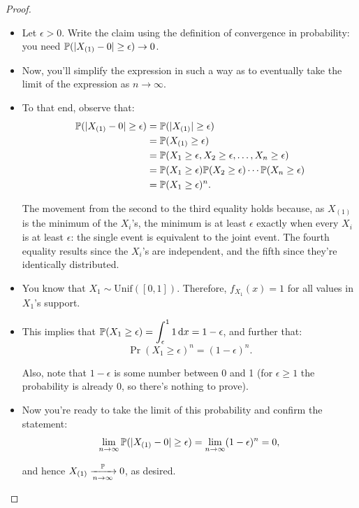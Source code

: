 \begin{proof}
\leavevmode %
\begin{itemize}

\item Let $\epsilon > 0$.
Write the claim using the definition of convergence in probability: you need $\mathbb{P}(\lvert X_{(1)} - 0\rvert \geq \epsilon) \to 0$.

\item Now, you'll simplify the expression in such a way as to eventually take the limit of the expression as $n \to \infty$.

\item To that end, observe that:
\begin{align*}
\mathbb{P}(\lvert X_{(1)} - 0\rvert \geq \epsilon) &= \mathbb{P}(\lvert X_{(1)}\rvert \geq \epsilon) \\
								&= \mathbb{P}(X_{(1)} \geq \epsilon) \\
								&= \mathbb{P}(X_1 \geq \epsilon, X_2 \geq \epsilon, \ldots, X_n \geq \epsilon) \\
								&= \mathbb{P}(X_1 \geq \epsilon) \mathbb{P}(X_2 \geq \epsilon) \cdots \mathbb{P}(X_n \geq \epsilon) \\
								&= \mathbb{P}(X_1 \geq \epsilon)^n.
\end{align*}

The movement from the second to the third equality holds because, as $X_{(1)}$ is the minimum of the $X_i$'s, the minimum is at least $\epsilon$ exactly when every $X_i$ is at least $\epsilon$: the single event is equivalent to the joint event.
The fourth equality results since the $X_i$'s are independent, and the fifth since they're identically distributed.

\item You know that $X_1 \sim \text{Unif}([0,1])$.
Therefore, $f_{{X}_1}(x) = 1$ for all values in $X_1$'s support.

\item This implies that $\displaystyle \mathbb{P}(X_1 \geq \epsilon) = \int_{\epsilon}^1 1 \, \mathrm{d} x = 1 - \epsilon$, and further that:
\[
\Pr(X_1 \geq \epsilon)^n = (1 - \epsilon)^n.
\]

Also, note that $1 - \epsilon$ is some number between 0 and 1 (for $\epsilon \geq 1$ the probability is already $0$, so there's nothing to prove).

\item Now you're ready to take the limit of this probability and confirm the statement:
\[
\lim_{n \to \infty} \mathbb{P}(\lvert X_{(1)} - 0\rvert \geq \epsilon) = \lim_{n \to \infty} (1 - \epsilon)^n = 0,
\]

and hence $X_{(1)} \xrightarrow [n \to \infty ]{\mathbb{P}} 0$, as desired.
\end{itemize}
\end{proof}

